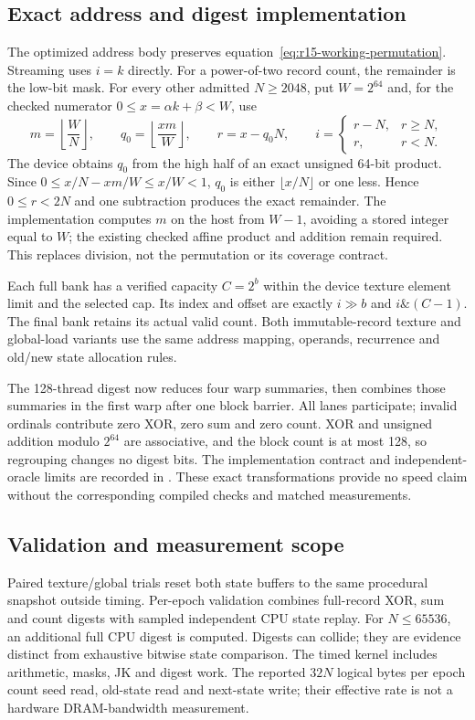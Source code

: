 \subsection{Exact address and digest implementation}
The optimized address body preserves equation~\eqref{eq:r15-working-permutation}.
Streaming uses $i=k$ directly. For a power-of-two record count, the remainder
is the low-bit mask. For every other admitted $N\ge2048$, put $W=2^{64}$
and, for the checked numerator $0\le x=\alpha k+\beta<W$, use
\begin{equation}
 m=\left\lfloor\frac WN\right\rfloor,\qquad
 q_0=\left\lfloor\frac{xm}{W}\right\rfloor,\qquad
 r=x-q_0N,\qquad
 i=\begin{cases}r-N,&r\ge N,\\r,&r<N.\end{cases}
 \label{eq:r15-working-reciprocal}
\end{equation}
The device obtains $q_0$ from the high half of an exact unsigned 64-bit
product. Since
$0\le x/N-xm/W\le x/W<1$, $q_0$ is either
$\lfloor x/N\rfloor$ or one less. Hence $0\le r<2N$ and one subtraction
produces the exact remainder. The implementation computes $m$ on the host
from $W-1$, avoiding a stored integer equal to $W$; the existing checked
affine product and addition remain required. This replaces division, not the
permutation or its coverage contract.

Each full bank has a verified capacity $C=2^b$ within the device texture
element limit and the selected cap. Its index and offset are exactly
$i\gg b$ and $i\mathbin{\&}(C-1)$. The final bank retains its actual valid
count. Both immutable-record texture and global-load variants use the same
address mapping, operands, recurrence and old/new state allocation rules.

The 128-thread digest now reduces four warp summaries, then combines those
summaries in the first warp after one block barrier. All lanes participate;
invalid ordinals contribute zero XOR, zero sum and zero count. XOR and
unsigned addition modulo $2^{64}$ are associative, and the block count is at
most 128, so regrouping changes no digest bits. The implementation contract
and independent-oracle limits are recorded in
\href{formal/WORD_CACHE_BENCHMARK.md}{}.
These exact transformations provide no speed claim without the corresponding
compiled checks and matched measurements.

\subsection{Validation and measurement scope}
Paired texture/global trials reset both state buffers to the same procedural
snapshot outside timing. Per-epoch validation combines full-record XOR, sum
and count digests with sampled independent CPU state replay. For
$N\le65536$, an additional full CPU digest is computed. Digests can collide;
they are evidence distinct from exhaustive bitwise state comparison. The
timed kernel includes arithmetic, masks, JK and digest work. The reported
$32N$ logical bytes per epoch count seed read, old-state read and next-state
write; their effective rate is not a hardware DRAM-bandwidth measurement.

